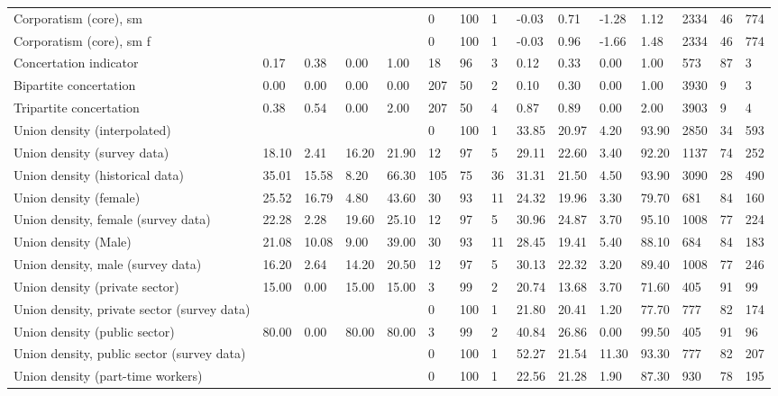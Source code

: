 \begin{longtable}{lllllllllllllll}
\addlinespace
Corporatism (core), sm &  &  &  &  & 0 & 100 & 1 & -0.03 & 0.71 & -1.28 & 1.12 & 2334 & 46 & 774\\
Corporatism (core), sm f &  &  &  &  & 0 & 100 & 1 & -0.03 & 0.96 & -1.66 & 1.48 & 2334 & 46 & 774\\
Concertation indicator & 0.17 & 0.38 & 0.00 & 1.00 & 18 & 96 & 3 & 0.12 & 0.33 & 0.00 & 1.00 & 573 & 87 & 3\\
Bipartite concertation & 0.00 & 0.00 & 0.00 & 0.00 & 207 & 50 & 2 & 0.10 & 0.30 & 0.00 & 1.00 & 3930 & 9 & 3\\
Tripartite concertation & 0.38 & 0.54 & 0.00 & 2.00 & 207 & 50 & 4 & 0.87 & 0.89 & 0.00 & 2.00 & 3903 & 9 & 4\\
\addlinespace
Union density (interpolated) &  &  &  &  & 0 & 100 & 1 & 33.85 & 20.97 & 4.20 & 93.90 & 2850 & 34 & 593\\
Union density (survey data) & 18.10 & 2.41 & 16.20 & 21.90 & 12 & 97 & 5 & 29.11 & 22.60 & 3.40 & 92.20 & 1137 & 74 & 252\\
Union density (historical data) & 35.01 & 15.58 & 8.20 & 66.30 & 105 & 75 & 36 & 31.31 & 21.50 & 4.50 & 93.90 & 3090 & 28 & 490\\
Union density (female) & 25.52 & 16.79 & 4.80 & 43.60 & 30 & 93 & 11 & 24.32 & 19.96 & 3.30 & 79.70 & 681 & 84 & 160\\
Union density, female (survey data) & 22.28 & 2.28 & 19.60 & 25.10 & 12 & 97 & 5 & 30.96 & 24.87 & 3.70 & 95.10 & 1008 & 77 & 224\\
\addlinespace
Union density (Male) & 21.08 & 10.08 & 9.00 & 39.00 & 30 & 93 & 11 & 28.45 & 19.41 & 5.40 & 88.10 & 684 & 84 & 183\\
Union density, male (survey data) & 16.20 & 2.64 & 14.20 & 20.50 & 12 & 97 & 5 & 30.13 & 22.32 & 3.20 & 89.40 & 1008 & 77 & 246\\
Union density (private sector) & 15.00 & 0.00 & 15.00 & 15.00 & 3 & 99 & 2 & 20.74 & 13.68 & 3.70 & 71.60 & 405 & 91 & 99\\
Union density, private sector (survey data) &  &  &  &  & 0 & 100 & 1 & 21.80 & 20.41 & 1.20 & 77.70 & 777 & 82 & 174\\
Union density (public sector) & 80.00 & 0.00 & 80.00 & 80.00 & 3 & 99 & 2 & 40.84 & 26.86 & 0.00 & 99.50 & 405 & 91 & 96\\
\addlinespace
Union density, public sector (survey data) &  &  &  &  & 0 & 100 & 1 & 52.27 & 21.54 & 11.30 & 93.30 & 777 & 82 & 207\\
Union density (part-time workers) &  &  &  &  & 0 & 100 & 1 & 22.56 & 21.28 & 1.90 & 87.30 & 930 & 78 & 195\\

\end{longtable}
